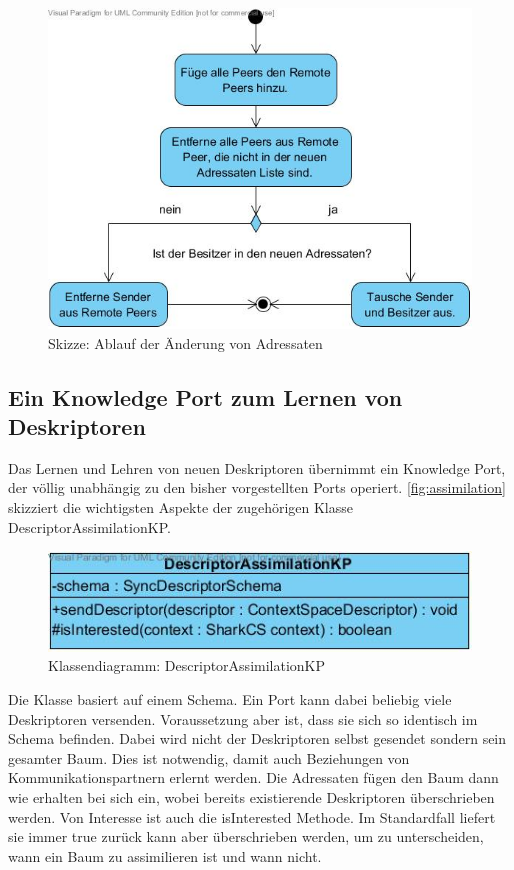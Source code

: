 \documentclass[a4paper]{article}
\begin{document}
	\begin{figure}[H]
		\centerline{
			\includegraphics[scale=0.66]{../Bilder/peer_sync.jpg}
		}
		\caption{Skizze: Ablauf der Änderung von Adressaten}
		\label{fig:peer_sync}
	\end{figure}	
		
	\subsection{Ein Knowledge Port zum Lernen von Deskriptoren}
	
	Das Lernen und Lehren von neuen Deskriptoren übernimmt ein Knowledge Port,
	der völlig unabhängig zu den bisher vorgestellten Ports operiert.
	\autoref{fig:assimilation} skizziert die wichtigsten Aspekte der
	zugehörigen Klasse DescriptorAssimilationKP.
	
	\begin{figure}[H]
		\includegraphics[width=\linewidth]{../Bilder/assimilation.jpg}
		\caption{Klassendiagramm: DescriptorAssimilationKP}
		\label{fig:assimilation}
	\end{figure}	
	
	Die Klasse basiert auf einem Schema. Ein Port kann dabei beliebig viele
	Deskriptoren versenden. Voraussetzung aber ist, dass sie sich so identisch 
	im Schema befinden. Dabei wird nicht der Deskriptoren selbst gesendet sondern
	sein gesamter Baum. Dies ist notwendig, damit auch Beziehungen von 
	Kommunikationspartnern erlernt werden. Die Adressaten fügen den
	Baum dann wie erhalten bei sich ein, wobei bereits existierende Deskriptoren 
	überschrieben werden. Von Interesse ist auch die isInterested Methode. 
	Im Standardfall liefert sie immer true zurück kann aber überschrieben werden,
	um zu unterscheiden, wann ein Baum zu assimilieren ist und wann nicht.
	
\end{document}
